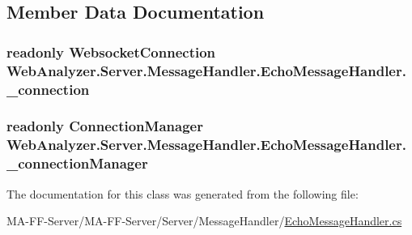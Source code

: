 \subsection{Member Data Documentation}
\hypertarget{class_web_analyzer_1_1_server_1_1_message_handler_1_1_echo_message_handler_a2a7b752d022345cb8b575f4a84435e1e}{}
\subsubsection[{\+\_\+connection}]{\setlength{\rightskip}{0pt plus 5cm}readonly {\bf Websocket\+Connection} Web\+Analyzer.\+Server.\+Message\+Handler.\+Echo\+Message\+Handler.\+\_\+connection\hspace{0.3cm}{\ttfamily [private]}}\label{class_web_analyzer_1_1_server_1_1_message_handler_1_1_echo_message_handler_a2a7b752d022345cb8b575f4a84435e1e}
\hypertarget{class_web_analyzer_1_1_server_1_1_message_handler_1_1_echo_message_handler_a936f408ce4e67d13029830db8a3cd398}{}
\subsubsection[{\+\_\+connection\+Manager}]{\setlength{\rightskip}{0pt plus 5cm}readonly {\bf Connection\+Manager} Web\+Analyzer.\+Server.\+Message\+Handler.\+Echo\+Message\+Handler.\+\_\+connection\+Manager\hspace{0.3cm}{\ttfamily [private]}}\label{class_web_analyzer_1_1_server_1_1_message_handler_1_1_echo_message_handler_a936f408ce4e67d13029830db8a3cd398}


The documentation for this class was generated from the following file\+:\begin{DoxyCompactItemize}
\item 
M\+A-\/\+F\+F-\/\+Server/\+M\+A-\/\+F\+F-\/\+Server/\+Server/\+Message\+Handler/\hyperlink{_echo_message_handler_8cs}{Echo\+Message\+Handler.\+cs}\end{DoxyCompactItemize}
